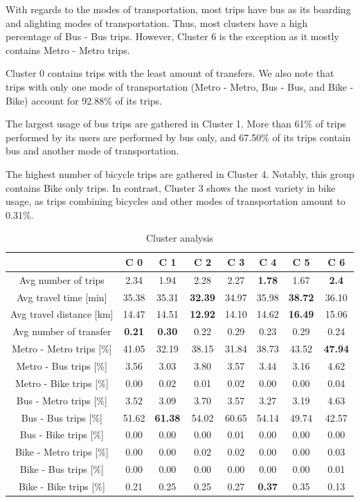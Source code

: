 \documentclass{article}
\begin{document}
With regards to the modes of transportation, most trips have bus as its boarding and alighting modes of transportation. Thus, most clusters have a high percentage of Bus - Bus trips. However, Cluster 6 is the exception as it mostly contains Metro - Metro trips. 

Cluster 0 contains trips with the least amount of transfers. We also note that trips with only one mode of transportation (Metro - Metro, Bus - Bus, and Bike - Bike) account for 92.88\% of its trips.

The largest usage of bus trips are gathered in Cluster 1. More than 61\% of trips performed by its users are performed by bus only, and 67.50\% of its trips contain bus and another mode of transportation.  

The highest number of bicycle trips are gathered in Cluster 4. Notably, this group contains Bike only trips. In contrast, Cluster 3 shows the most variety in bike usage, as trips combining bicycles and other modes of transportation amount to 0.31\%. 

\begin{table}[H]
\centering
\begin{tabular}{||c|c|c|c|c|c|c|c||}
\hline
 & \textbf{C 0} & \textbf{C 1} & \textbf{C 2} & \textbf{C 3} & \textbf{C 4}  & \textbf{C 5} & \textbf{C 6} \\
[0.5ex] 
\hline \hline 
Avg number of trips & 2.34 & 1.94 & 2.28 & 2.27 & \textbf{1.78} & 1.67 & \textbf{2.4} \\
Avg travel time [min] & 35.38 & 35.31 & \textbf{32.39} & 34.97 & 35.98 & \textbf{38.72} & 36.10 \\
Avg travel distance [km] & 14.47 & 14.51 & \textbf{12.92} & 14.10 & 14.62 & \textbf{16.49} & 15.06 \\ 
Avg number of transfer & \textbf{0.21} & \textbf{0.30} & 0.22 & 0.29 & 0.23 & 0.29 & 0.24 \\ 
\hline
Metro - Metro trips [\%] & 41.05 & 32.19 & 38.15 & 31.84 & 38.73 & 43.52 & \textbf{47.94} \\ 
Metro - Bus trips [\%] & 3.56 & 3.03 & 3.80 & 3.57 & 3.44 & 3.16 & 4.62 \\
Metro - Bike trips [\%] & 0.00 & 0.02 & 0.01 & 0.02 & 0.00 & 0.00 & 0.04 \\
Bus - Metro trips [\%] & 3.52 & 3.09 & 3.70 & 3.57 & 3.27 & 3.19 & 4.63 \\ 
Bus - Bus trips [\%] & 51.62 & \textbf{61.38} & 54.02 & 60.65 & 54.14 & 49.74 & 42.57    \\ 
Bus - Bike trips [\%] & 0.00 & 0.00 & 0.00 & 0.01 & 0.00 & 0.00 & 0.00  \\
Bike - Metro trips [\%] & 0.00 & 0.00 & 0.02 & 0.02 & 0.00 & 0.00 & 0.03 \\
Bike - Bus trips [\%] & 0.00 & 0.00 & 0.00 & 0.00 & 0.00 & 0.00 & 0.01  \\
Bike - Bike trips [\%] & 0.21 & 0.25 & 0.25 & 0.27 & \textbf{0.37} & 0.35 & 0.13 \\  [1ex]
\hline 
\end{tabular}
\caption{Cluster analysis} %
\label{table:clusterAnalysis}
\end{table}
\end{document}
